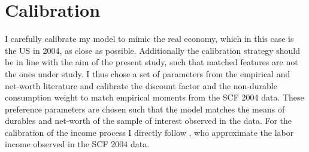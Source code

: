 \documentclass[a4paper,12pt,legno]{article}
\begin{document}
\section{Calibration}
I carefully calibrate my model to mimic the real economy, which in this case is the US in 2004, as close as possible. Additionally the calibration strategy should be in line with the aim of the present study, such that matched features are not the ones under study. I thus chose a set of parameters from the empirical and net-worth literature and calibrate the discount factor and the non-durable consumption weight to match empirical moments from the SCF 2004 data. These preference parameters are chosen such that the model matches the means of durables and net-worth of the sample of interest observed in the data. For the calibration of the income process I directly follow \cite{hintermaier2011}, who approximate the labor income observed in the SCF 2004 data. 
\end{document}
